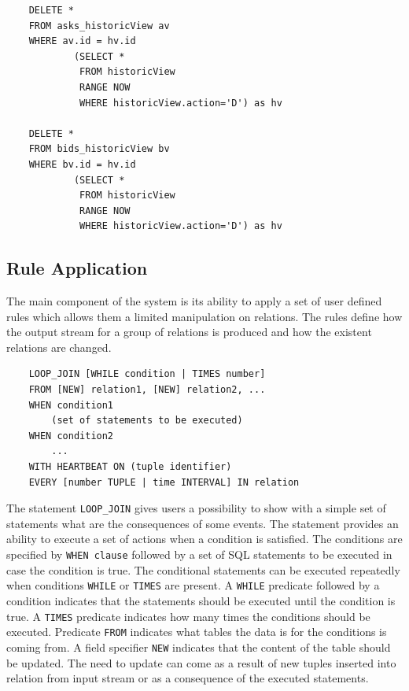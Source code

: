 \documentclass{article}
\begin{document}
\begin{verbatim}  
    DELETE *
    FROM asks_historicView av
    WHERE av.id = hv.id
            (SELECT * 
             FROM historicView
             RANGE NOW
             WHERE historicView.action='D') as hv  

    DELETE *
    FROM bids_historicView bv
    WHERE bv.id = hv.id
            (SELECT * 
             FROM historicView
             RANGE NOW
             WHERE historicView.action='D') as hv 
\end{verbatim}

\subsection{Rule Application}

The main component of the system is its ability to apply a set of user defined rules which allows them a limited manipulation on relations. The rules define how the output stream for a group of relations is produced and how the existent relations are changed. 

\begin{verbatim}
    LOOP_JOIN [WHILE condition | TIMES number]
    FROM [NEW] relation1, [NEW] relation2, ... 
    WHEN condition1
        (set of statements to be executed)
    WHEN condition2
        ...
    WITH HEARTBEAT ON (tuple identifier)
    EVERY [number TUPLE | time INTERVAL] IN relation 
\end{verbatim}

The statement {\tt LOOP\_JOIN} gives users a possibility to show with a simple set of statements what are the consequences of some events. The statement provides an ability to execute a set of actions when a condition is satisfied. The conditions are specified by {\tt WHEN clause} followed by a set of SQL statements to be executed in case the condition is true. The conditional statements can be executed repeatedly when conditions {\tt WHILE} or {\tt TIMES} are present. A {\tt WHILE} predicate followed by a condition indicates that the statements should be executed until the condition is true. A {\tt TIMES} predicate indicates how many times the conditions should be executed. Predicate {\tt FROM} indicates what tables the data is for the conditions is coming from. A field specifier {\tt NEW} indicates that the content of the table should be updated. The need to update can come as a result of new tuples inserted into relation from input stream or as a consequence of the executed statements.   
\end{document}
